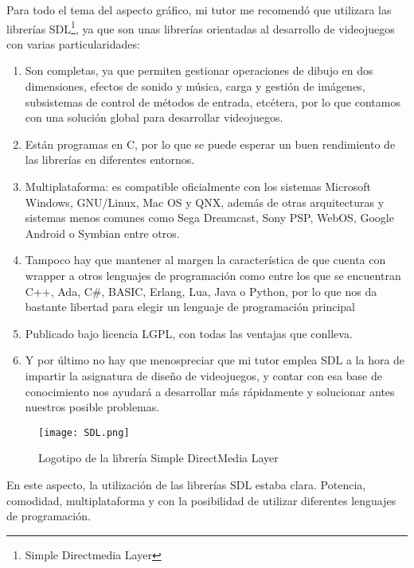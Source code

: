 Para todo el tema del aspecto gráfico, mi tutor me recomendó que utilizara las librerías SDL\footnote{Simple
Directmedia Layer}, ya que son unas librerías orientadas al desarrollo de videojuegos con varias particularidades:
\begin{enumerate}
    \item Son completas, ya que permiten gestionar operaciones de dibujo en dos dimensiones, efectos de
            sonido y música, carga y gestión de imágenes, subsistemas de control de métodos de entrada,
            etcétera, por lo que contamos con una solución global para desarrollar videojuegos.
    \item Están programas en C, por lo que se puede esperar un buen rendimiento de las librerías en
            diferentes entornos.
    \item Multiplataforma: es compatible oficialmente con los sistemas Microsoft Windows, GNU/Linux,
            Mac OS y QNX, además de otras arquitecturas y sistemas menos comunes como Sega Dreamcast, Sony PSP,
            WebOS, Google Android o Symbian entre otros.
    \item Tampoco hay que mantener al margen la característica de que cuenta con wrapper a otros lenguajes
            de programación como entre los que se encuentran C++, Ada, C\#, BASIC, Erlang, Lua, Java o Python, por
            lo que nos da bastante libertad para elegir un lenguaje de programación principal
    \item Publicado bajo licencia LGPL, con todas las ventajas que conlleva.
    \item Y por último no hay que menospreciar que mi tutor emplea SDL a la hora de impartir la asignatura
            de diseño de videojuegos, y contar con esa base de conocimiento nos ayudará a desarrollar más rápidamente
            y solucionar antes nuestros posible problemas.
\end{enumerate}

\begin{figure}[h]
  \label{logo-sdl}
  \begin{center}
    \texttt{[image: SDL.png]}
  \end{center}
  \caption{Logotipo de la librería Simple DirectMedia Layer}
\end{figure}

En este aspecto, la utilización de las librerías SDL estaba clara. Potencia, comodidad, multiplataforma y con la posibilidad
de utilizar diferentes lenguajes de programación.


